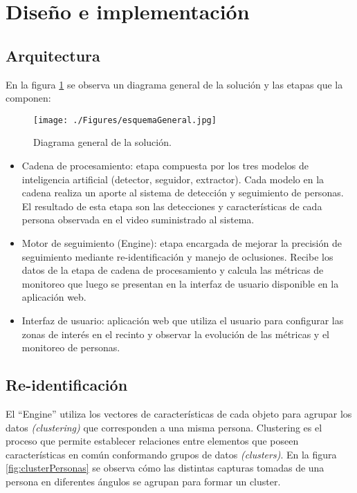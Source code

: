 \documentclass[a4paper]{IEEEtran}
\begin{document}
\section{Diseño e implementación}

\subsection{Arquitectura}

En la figura \ref{fig:esquemaGeneral} se observa un diagrama general de la solución y las etapas que la componen:

\begin{figure}[htbp]
\centerline{\texttt{[image: ./Figures/esquemaGeneral.jpg]}}
\caption{Diagrama general de la solución.}
\label{fig:esquemaGeneral}
\end{figure}

\begin{itemize}
\item Cadena de procesamiento: etapa compuesta por los tres modelos de inteligencia artificial (detector, seguidor, extractor). Cada modelo en la cadena realiza un aporte al sistema de detección y seguimiento de personas. El resultado de esta etapa son las detecciones y características de cada persona observada en el video suministrado al sistema.
\item Motor de seguimiento (Engine): etapa encargada de mejorar la precisión de seguimiento mediante re-identificación y manejo de oclusiones. Recibe los datos de la etapa de cadena de procesamiento y calcula las métricas de monitoreo que luego se presentan en la interfaz de usuario disponible en la aplicación web.
\item Interfaz de usuario: aplicación web que utiliza el usuario para configurar las zonas de interés en el recinto y observar la evolución de las métricas y el monitoreo de personas.
\end{itemize}

\subsection{Re-identificación}
\label{seccionreid}

El “Engine” utiliza los vectores de características de cada objeto para agrupar los datos \textit{(clustering)} que corresponden a una misma persona. Clustering es el proceso que permite establecer relaciones entre elementos que poseen características en común conformando grupos de datos \textit{(clusters)}. En la figura \ref{fig:clusterPersonas} se observa cómo las distintas capturas tomadas de una persona en diferentes ángulos se agrupan para formar un cluster.
\end{document}
